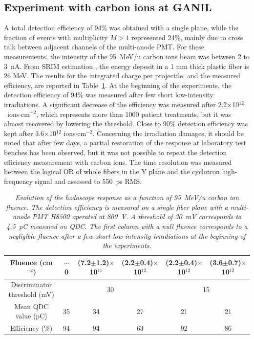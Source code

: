 \documentclass[a4paper,11pt]{article}
\begin{document}
\subsection{Experiment with carbon ions at GANIL}
A total detection efficiency of 94\% was obtained with a single plane, while the fraction of events with multiplicity $M>1$ represented 24\%, mainly due to cross talk between adjacent channels of the multi-anode PMT. For these measurements, the intensity of the 95~MeV/u carbon ions beam was between 2 to 3~nA.
From SRIM estimation \cite{Ziegler2010}, the energy deposit in a 1 mm thick plastic fiber is 26 MeV. The results for the integrated charge per projectile, and the measured efficiency, are reported in Table~\ref{tab:GANIL}. At the beginning of the experiments, the detection efficiency of 94\% was measured after few short low-intensity irradiations. A significant decrease of the efficiency was measured after 2.2$\times$10$^{12}$~ions$\cdot$cm$^{-2}$, which represents more than 1000 patient treatments, but it was almost recovered by lowering the threshold.
Close to 90\% detection efficiency was kept after 3.6$\times$10$^{12}$ ions$\cdot$cm$^{-2}$.
Concerning the irradiation damages, it should be noted that after few days, a partial restoration of the response at laboratory test benches has been observed, but it was not possible to repeat the detection efficiency measurement with carbon ions. 
The time resolution was measured between the logical OR of whole fibers in the Y plane and the cyclotron high-frequency signal and assessed to 550~ps RMS. 
\begin{table}[htb]
\caption{\small{\textit{Evolution of the hodoscope response as a function of 95~MeV/u carbon ion fluence. The detection efficiency is measured on a single fiber plane with a multi-anode PMT H8500 operated at 800~V. A threshold of 30~mV corresponds to 4.5~pC measured on QDC. The first column with a null fluence corresponds to a negligible fluence after a few short low-intensity irradiations at the beginning of the experiments.}}}
\centering
\begin{tabular}{|c|c|c|c|c|c|}
\hline
Fluence (cm$^{-2}$)& $\sim$0 & (7.2$\pm$1.2)$\times$10$^{11}$ & (2.2$\pm$0.4)$\times$10$^{12}$ & (2.2$\pm$0.4)$\times$10$^{12}$ & (3.6$\pm$0.7)$\times$10$^{12}$\\
\hline
\makecell{Discriminator\\threshold (mV)} & \multicolumn{3}{c|}{30} &\multicolumn{2}{c|}{15}\\
\hline
\makecell{Mean QDC\\value (pC)} & 35 & 34 & 27 & 21 & 21\\
\hline
Efficiency (\%) & 94 & 94 & 63 & 92 & 86\\
\hline
\end{tabular}
\label{tab:GANIL}
\end{table}
\end{document}
